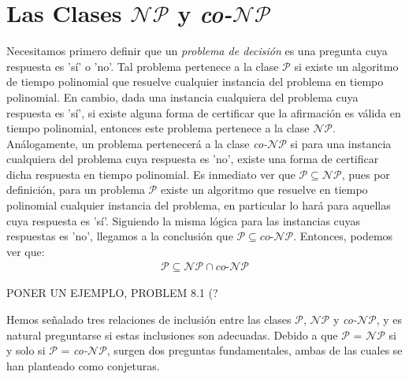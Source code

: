 \documentclass{article}
\begin{document}
\section*{Las Clases \textit{\textbf{$\mathcal{N}\mathcal{P}$}} y
\textit{\textbf{co-$\mathcal{N}\mathcal{P}$}}}
\indent Necesitamos primero definir que un \textit{problema de decisión}
es una pregunta cuya respuesta es 'sí' o 'no'. Tal problema pertenece
a la clase \textit{$\mathcal{P}$} si existe un algoritmo de tiempo
polinomial que resuelve cualquier instancia del problema en tiempo
polinomial. En cambio, dada una instancia
cualquiera del problema cuya respuesta es 'sí', si existe alguna forma de 
certificar que la afirmación es válida en tiempo polinomial, entonces este problema
pertenece a la clase \textit{$\mathcal{N}\mathcal{P}$}. Análogamente,
un problema pertenecerá a la clase \textit{co-$\mathcal{N}\mathcal{P}$} si para
una instancia cualquiera del problema cuya respuesta es 'no', existe una forma
de certificar dicha respuesta en tiempo polinomial.\newline
\indent Es inmediato ver que $\textit{$\mathcal{P}$} \subseteq \textit{$\mathcal{N}\mathcal{P}$}$, pues por definición, para un problema \textit{$\mathcal{P}$} existe un algoritmo que resuelve en tiempo polinomial cualquier instancia del problema, en particular lo hará para aquellas cuya respuesta es 'sí'. Siguiendo la misma lógica para las instancias cuyas respuestas es 'no', llegamos a la conclusión que $\textit{$\mathcal{P}$} \subseteq \textit{co-$\mathcal{N}\mathcal{P}$}$. Entonces, podemos ver que:\newline
\begin{align*}
    \textit{$\mathcal{P}$} \subseteq \textit{$\mathcal{N}\mathcal{P}$} \cap \textit{co-$\mathcal{N}\mathcal{P}$}
\end{align*} 


\indent PONER UN EJEMPLO, PROBLEM 8.1 (?  \newline
\newline
\newline
\newline



\indent Hemos señalado tres relaciones de inclusión entre las clases \textit{$\mathcal{P}$}, \textit{$\mathcal{N}\mathcal{P}$} y \textit{co-$\mathcal{N}\mathcal{P}$}, y es natural preguntarse si estas inclusiones son adecuadas. Debido a que \textit{$\mathcal{P}$} = \textit{$\mathcal{N}\mathcal{P}$} si y solo si \textit{$\mathcal{P}$} = \textit{co-$\mathcal{N}\mathcal{P}$}, surgen dos preguntas fundamentales, ambas de las cuales se han planteado como conjeturas. \newline
\end{document}
